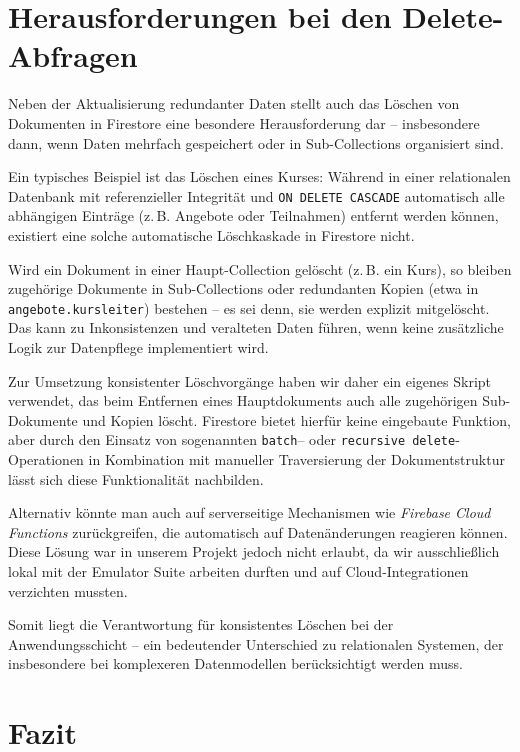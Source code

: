 \documentclass[12pt,a4paper%
              ,oneside     %
              ,titlepage
              ,DIV=13
              ,headinclude
              ,footinclude=false%
              ,cleardoublepage=empty%
              ,parskip=half,
              BCOR=0mm,
              ]{scrreprt}
\begin{document}
\chapter{Herausforderungen bei den Delete-Abfragen}
\label{delete-label}

Neben der Aktualisierung redundanter Daten stellt auch das Löschen von Dokumenten in Firestore eine besondere Herausforderung dar – insbesondere dann, wenn Daten mehrfach gespeichert oder in Sub-Collections organisiert sind.

Ein typisches Beispiel ist das Löschen eines Kurses: Während in einer relationalen Datenbank mit referenzieller Integrität und \texttt{ON DELETE CASCADE} automatisch alle abhängigen Einträge (z.\,B. Angebote oder Teilnahmen) entfernt werden können, existiert eine solche automatische Löschkaskade in Firestore nicht.

Wird ein Dokument in einer Haupt-Collection gelöscht (z.\,B. ein Kurs), so bleiben zugehörige Dokumente in Sub-Collections oder redundanten Kopien (etwa in \texttt{angebote.kursleiter}) bestehen – es sei denn, sie werden explizit mitgelöscht. Das kann zu Inkonsistenzen und veralteten Daten führen, wenn keine zusätzliche Logik zur Datenpflege implementiert wird.

Zur Umsetzung konsistenter Löschvorgänge haben wir daher ein eigenes Skript verwendet, das beim Entfernen eines Hauptdokuments auch alle zugehörigen Sub-Dokumente und Kopien löscht. Firestore bietet hierfür keine eingebaute Funktion, aber durch den Einsatz von sogenannten \texttt{batch}– oder \texttt{recursive delete}-Operationen in Kombination mit manueller Traversierung der Dokumentstruktur lässt sich diese Funktionalität nachbilden.

Alternativ könnte man auch auf serverseitige Mechanismen wie \textit{Firebase Cloud Functions} zurückgreifen, die automatisch auf Datenänderungen reagieren können. Diese Lösung war in unserem Projekt jedoch nicht erlaubt, da wir ausschließlich lokal mit der Emulator Suite arbeiten durften und auf Cloud-Integrationen verzichten mussten.

Somit liegt die Verantwortung für konsistentes Löschen bei der Anwendungsschicht – ein bedeutender Unterschied zu relationalen Systemen, der insbesondere bei komplexeren Datenmodellen berücksichtigt werden muss.

\chapter{Fazit}
\end{document}
